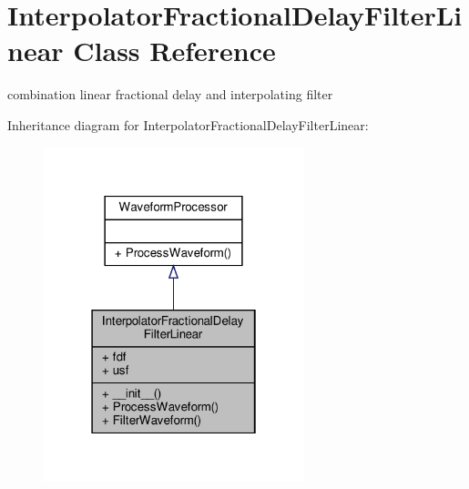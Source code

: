 \hypertarget{classSignalIntegrity_1_1TimeDomain_1_1Filters_1_1InterpolatorLinear_1_1InterpolatorFractionalDelayFilterLinear}{}\section{Interpolator\+Fractional\+Delay\+Filter\+Linear Class Reference}
\label{classSignalIntegrity_1_1TimeDomain_1_1Filters_1_1InterpolatorLinear_1_1InterpolatorFractionalDelayFilterLinear}


combination linear fractional delay and interpolating filter  




Inheritance diagram for Interpolator\+Fractional\+Delay\+Filter\+Linear\+:\nopagebreak
\begin{figure}[H]
\begin{center}
\leavevmode
\includegraphics[width=214pt]{classSignalIntegrity_1_1TimeDomain_1_1Filters_1_1InterpolatorLinear_1_1InterpolatorFractionalDelayFilterLinear__inherit__graph}
\end{center}
\end{figure}



